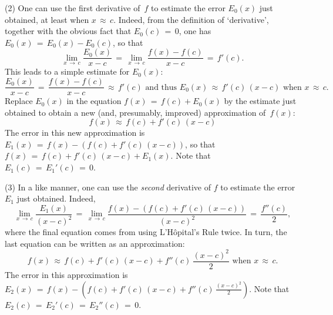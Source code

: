 {\V

        (2)  One can use the first derivative of~$f$ to estimate the error $E_{0}(x)$ just obtained, at least when $x \,{\approx}\, c$.
    Indeed, from the definition of `derivative', together with the obvious fact that $E_{0}(c) \,=\, 0$, one has $E_{0}(x) \,=\, E_{0}(x) - E_{0}(c)$, so that
        \begin{displaymath}
        \lim_{x \,{\rightarrow}\, c} \frac{E_{0}(x)}{x-c} \,=\, \lim_{x \,{\rightarrow}\, c} \frac{f(x)-f(c)}{x-c} \,=\, f'(c).
        \end{displaymath}
    This leads to a simple estimate for $E_{0}(x)$:
        \begin{displaymath}
        \frac{E_{0}(x)}{x-c} \,=\, \frac{f(x)-f(c)}{x-c}  \,{\approx}\, f'(c) \mbox{ and thus }
        E_{0}(x) \,{\approx}\, f'(c)\,(x-c)  \mbox{ when $x \,{\approx}\, c$}.
        \end{displaymath}
    Replace $E_{0}(x)$ in the equation $f(x) \,=\, f(c) + E_{0}(x)$ by the estimate just obtained
    to obtain a new (and, presumably, improved) approximation of~$f(x)$:
        \begin{displaymath}
        f(x) \,{\approx}\, f(c) + f'(c)\,(x-c)
        \end{displaymath}
    The error in this new approximation is $E_{1}(x) \,=\, f(x) - (f(c) + f'(c)\,(x-c))$, so that $f(x) \,=\, f(c) + f'(c)\,(x-c) + E_{1}(x)$.
    Note that $E_{1}(c) \,=\, E_{1}'(c) \,=\, 0$.

\V

        (3) In a like manner, one can use the {\em second} derivative of $f$ to estimate the error $E_{1}$ just obtained.
    Indeed,
        \begin{displaymath}
        \lim_{x \,{\rightarrow}\, c} \frac{E_{1}(x)}{(x-c)^{2}}
     \,=\, 
        \lim_{x \,{\rightarrow}\, c} \frac{f(x) - (f(c) + f'(c)\,(x-c))}{(x-c)^{2}}
     \,=\, 
        \frac{f''(c)}{2},
        \end{displaymath}
    where the final equation comes from using L'H\^{o}pital's Rule twice. In turn, the last equation can be written as an approximation:
        \begin{displaymath}
        f(x) \,{\approx}\, f(c) + f'(c)\,(x-c) + f''(c)\,\frac{(x-c)^{2}}{2} \mbox{ when $x \,{\approx}\, c$}.
        \end{displaymath}
    The error in this approximation is $E_{2}(x) \,=\, {\displaystyle f(x) - \left(f(c) + f'(c)\,(x-c) + f''(c)\,\frac{(x-c)^{2}}{2}\right)}$.
    Note that $E_{2}(c) \,=\, E_{2}'(c) \,=\, E_{2}''(c) \,=\, 0$.

}
